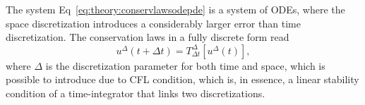 
The system Eq~\eqref{eq:theory:conservlawsodepde} is a system of \acp{ODE}, where the space discretization introduces a considerably larger error than time discretization.
The conservation laws in a fully discrete form read 
%
\begin{equation}
u^{\Delta}(t+\Delta t) = T^{\Delta} _{\Delta t}[u^{\Delta}(t)],
\end{equation}
%
where $\Delta$ is the discretization parameter for both time and space, which is 
possible to introduce due to \ac{CFL} condition, which is, in essence, a linear stability
condition of a time-integrator that links two discretizations. 

